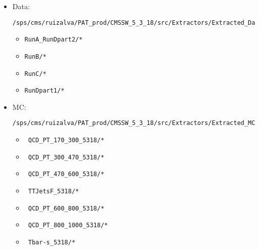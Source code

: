 \documentclass[11pt,a4paper]{article}
\begin{document}
\begin{itemize}
\item Data:
\begin{verbatim}
/sps/cms/ruizalva/PAT_prod/CMSSW_5_3_18/src/Extractors/Extracted_Data/
\end{verbatim}
  \begin{itemize}
  \item
\begin{verbatim}
RunA_RunDpart2/*
\end{verbatim}
\item
\begin{verbatim}
RunB/*
\end{verbatim}
\item
\begin{verbatim}
RunC/*
\end{verbatim}
\item
\begin{verbatim}
RunDpart1/*
\end{verbatim}
  \end{itemize}
\item MC:
\begin{verbatim}
/sps/cms/ruizalva/PAT_prod/CMSSW_5_3_18/src/Extractors/Extracted_MC/WithJER/
\end{verbatim}
  \begin{itemize}
  \item \begin{verbatim} QCD_PT_170_300_5318/* \end{verbatim}
  \item \begin{verbatim} QCD_PT_300_470_5318/* \end{verbatim}
  \item \begin{verbatim} QCD_PT_470_600_5318/* \end{verbatim}
  \item \begin{verbatim} TTJetsF_5318/* \end{verbatim}
  \item \begin{verbatim} QCD_PT_600_800_5318/* \end{verbatim}
  \item \begin{verbatim} QCD_PT_800_1000_5318/* \end{verbatim}
  \item \begin{verbatim} Tbar-s_5318/* \end{verbatim}

\end{itemize}
\end{itemize}
\end{document}
